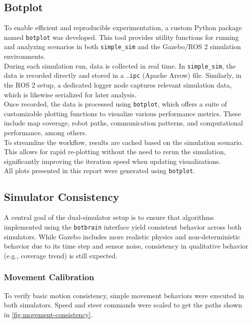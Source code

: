 \subsection{Botplot}
To enable efficient and reproducible experimentation, a custom Python package named \texttt{botplot} was developed. This tool provides utility functions for running and analyzing scenarios in both \texttt{simple\_sim} and the Gazebo/ROS 2 simulation environments. \\

During each simulation run, data is collected in real time. In \texttt{simple\_sim}, the data is recorded directly and stored in a \texttt{.ipc} (Apache Arrow) file. Similarly, in the ROS 2 setup, a dedicated logger node captures relevant simulation data, which is likewise serialized for later analysis. \\

Once recorded, the data is processed using \texttt{botplot}, which offers a suite of customizable plotting functions to visualize various performance metrics. These include map coverage, robot paths, communication patterns, and computational performance, among others. \\

To streamline the workflow, results are cached based on the simulation scenario. This allows for rapid re-plotting without the need to rerun the simulation, significantly improving the iteration speed when updating visualizations. \\

All plots presented in this report were generated using \texttt{botplot}.

\subsection{Simulator Consistency}
\label{sec:simulator-consistency}
A central goal of the dual-simulator setup is to ensure that algorithms implemented using the \texttt{botbrain} interface yield consistent behavior across both simulators. While Gazebo includes more realistic physics and non-deterministic behavior due to its time step and sensor noise, consistency in qualitative behavior (e.g., coverage trend) is still expected.

\subsubsection{Movement Calibration}
To verify basic motion consistency, simple movement behaviors were executed in both simulators. Speed and steer commands were scaled to get the paths shown in \cref{fig:movement-consistency}. 

